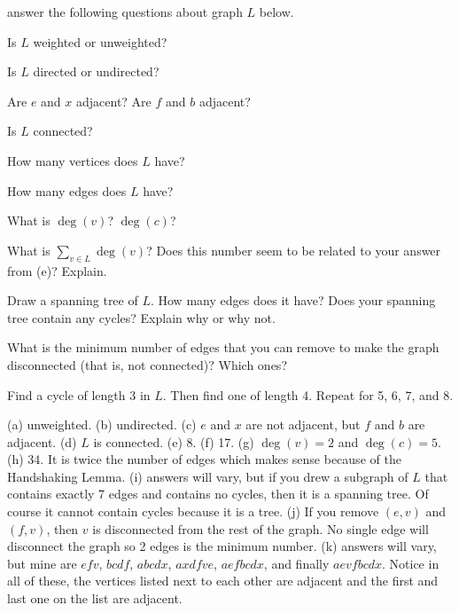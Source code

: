 \begin{requ}
answer the following questions about graph $L$ below.


\noindent
\begin{minipage}[b]{.5\textwidth}
\begin{lenum}
\item Is $L$ weighted or unweighted? 
\item Is $L$ directed or undirected? 
\item Are $e$ and $x$ adjacent? Are $f$ and $b$ adjacent?
\item Is $L$ connected?
\item How many vertices does $L$ have?
\item How many edges does $L$ have?
\item What is $\deg(v)$? $\deg(c)$? 
\setcounter{mygraphquestioncounter}{\value{enumi}}
\end{lenum}
\end{minipage}
\hfill
\vspace*{0in}

\begin{lenum}
\setcounter{enumi}{\value{mygraphquestioncounter}}
\item What is $\sum_{v\in L} \deg(v)$? 
Does this number seem to be related to your answer from (e)? Explain.
\item Draw a spanning tree of $L$. How many edges does it have?
Does your spanning tree contain any cycles? Explain why or why not.
\item What is the minimum number of edges that you can remove to make the graph disconnected
(that is, not connected)? Which ones?
\item Find a cycle of length 3 in $L$. Then find one of length 4. Repeat for 5, 6, 7, and 8.
\end{lenum}
\begin{requanswer}
(a) unweighted.
(b) undirected.
(c) $e$ and $x$ are not adjacent, but  $f$ and $b$ are adjacent. 
(d) $L$ is connected.
(e) 8.
(f) 17.
(g) $\deg(v)=2$ and $\deg(c)=5$. 
(h) 34. It is twice the number of edges which makes sense because of the Handshaking Lemma.
(i) answers will vary, but if you drew a subgraph of $L$ that contains exactly 7 edges and contains no cycles,
then it is a spanning tree. Of course it cannot contain cycles because it is a tree.
(j) If you remove $(e,v)$ and $(f,v)$, then $v$ is disconnected from the rest of the graph. No single edge
will disconnect the graph so 2 edges is the minimum number.
(k) answers will vary, but mine are $efv$, $bcdf$, $abcdx$, $axdfve$, $aefbcdx$, and finally $aevfbcdx$.
Notice in all of these, the vertices listed next to each other are adjacent and the first and last one on the list are adjacent.
\end{requanswer}
\end{requ}

